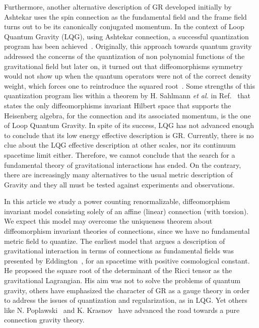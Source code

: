 \documentclass[twocolumn,aps,
  showpacs,showkeys,prd,superscriptaddress]{revtex4-1}
\begin{document}
Furthermore, another alternative description of GR developed initially by Ashtekar uses the spin connection as the fundamental field and the frame field turns out to be its canonically conjugated momentum. In the context of Loop Quantum Gravity (LQG), using Ashtekar connection, a successful quantization program has been achieved~\cite{Ashtekar:2004eh,thiemann2007loop}. Originally, this approach towards quantum gravity addressed the concerns of the quantization of non polynomial functions of the gravitational field but later on, it turned out that diffeomorphisms symmetry would not show up when the quantum operators were not of the correct density weight, which forces one to reintroduce the squared root~\cite{Thiemann:1996aw}.  Some  strengths of this quantization program lies within a theorem by H. Sahlmann \emph{et al.} in Ref.~\cite{Lewandowski:2005jk} that states the only diffeomorphisms invariant Hilbert space that supports the Heisenberg algebra, for the connection and its associated momentum, is the one of Loop Quantum Gravity. In spite of its success, LQG has not advanced enough to conclude that its low energy effective description is GR. Currently, there is no clue about the LQG effective description at other scales,  nor its continuum spacetime limit either. Therefore, we cannot conclude that the search for a fundamental theory of gravitational interactions has ended. On the contrary, there are increasingly many alternatives to the usual metric description of Gravity and they all must be tested against experiments and observations.

In this article we study a power counting renormalizable,  diffeomorphism invariant model  consisting  solely of an affine (linear) connection  (with torsion). We expect  this model may  overcome  the uniqueness theorem about diffeomorphism invariant theories of connections, since we  have no fundamental metric field to quantize. The earliest model that argues  a description of gravitational interaction in terms of connections as fundamental fields  was presented by Eddington~\cite{Eddington1923math}, for an spacetime with positive cosmological constant. He proposed the square root of the determinant of the Ricci tensor as the gravitational Lagrangian. His aim was not to solve the problems of quantum gravity,  others have emphasized the character of GR as a gauge theory in order to address the issues of quantization and regularization, as in LQG. Yet others like N. Poplawski~\cite{Poplawski:2012bw} and K. Krasnov~\cite{Krasnov:2011pp} have advanced the road towards a pure connection gravity theory.
\end{document}
